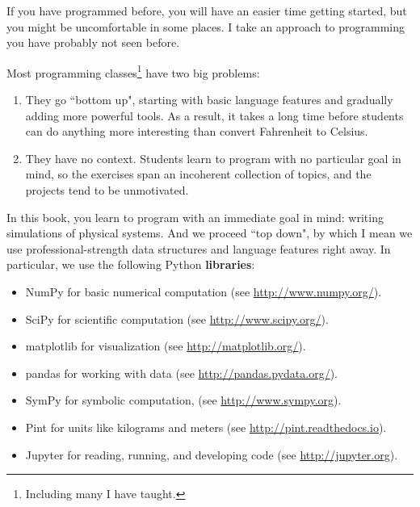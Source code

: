 \documentclass[12pt]{book}
\theoremstyle{exercise}
\begin{document}
If you have programmed before, you will have an easier time getting started, but you might be uncomfortable in some places.  I take an approach to programming you have probably not seen before.

Most programming classes\footnote{Including many I have taught.} have two big problems:

\begin{enumerate}

\item They go ``bottom up", starting with basic language features and gradually adding more powerful tools.  As a result, it takes a long time before students can do anything more interesting than convert Fahrenheit to Celsius.

\item They have no context.  Students learn to program with no particular goal in mind, so the exercises span an incoherent collection of topics, and the projects tend to be unmotivated.

\end{enumerate}

In this book, you learn to program with an immediate goal in mind: writing simulations of physical systems.  And we proceed ``top down", by which I mean we use professional-strength data structures and language features right away.  In particular, we use the following Python {\bf libraries}:

\begin{itemize}

\item NumPy for basic numerical computation (see \url{http://www.numpy.org/}).

\item SciPy for scientific computation (see \url{http://www.scipy.org/}).

\item matplotlib for visualization (see \url{http://matplotlib.org/}).

\item pandas for working with data (see \url{http://pandas.pydata.org/}).

\item SymPy for symbolic computation, (see \url{http://www.sympy.org}).

\item Pint for units like kilograms and meters (see \url{http://pint.readthedocs.io}).

\item Jupyter for reading, running, and developing code (see \url{http://jupyter.org}).

\end{itemize}
\end{document}
